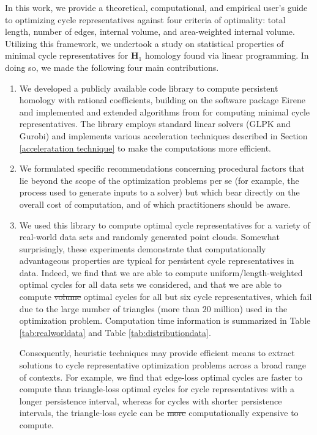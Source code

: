 \documentclass[utf8]{formatting_stuff/frontiersFPHY}
\newcommand{\Homologies}[0]{\mathbf{H}}
\newcommand{\tab}{Table }
\newcommand{\se}{Section }
\theoremstyle{plain}
\theoremstyle{definition}
\providecommand{\DIFaddtex}[1]{{\protect\color{blue}\uwave{#1}}}
\providecommand{\DIFdeltex}[1]{{\protect\color{red}\sout{#1}}}
\providecommand{\DIFaddbegin}{} %
\providecommand{\DIFaddend}{} %
\providecommand{\DIFdelbegin}{} %
\providecommand{\DIFdelend}{} %
\providecommand{\DIFadd}[1]{\texorpdfstring{\DIFaddtex{#1}}{#1}} %
\providecommand{\DIFdel}[1]{\texorpdfstring{\DIFdeltex{#1}}{}} %
\begin{document}
In this work, we provide a theoretical, computational, and empirical user's guide to optimizing cycle representatives against four criteria of optimality: total length, number of edges, internal volume, and area-weighted internal volume. Utilizing this framework, we undertook a study on statistical properties of minimal cycle representatives for $\Homologies_1$ homology found via linear programming. In doing so, we made the following four main contributions.
\begin{enumerate}
    \item We developed a publicly available code library \cite{li_thompson} to compute persistent homology with rational coefficients, building on the software package Eirene \cite{eirene} and implemented and extended algorithms from \cite{Escolar2016, Obayashi2018}  for computing minimal cycle representatives. The library employs standard linear solvers (GLPK and Gurobi) and implements various acceleration techniques described in \se \ref{acceleratation technique} to make the computations more efficient. 
    \item We formulated specific recommendations concerning procedural factors that lie beyond the scope of the optimization problems per se (for example, the process used to generate inputs to a solver) but which bear directly on the overall cost of computation, and of which practitioners should be aware. 
    \item We used this library to compute optimal cycle representatives for a variety of real-world data sets and randomly generated point clouds.  Somewhat surprisingly, these experiments demonstrate that computationally advantageous properties are typical for persistent cycle representatives in data. Indeed, we find that we are able to compute uniform/length-weighted optimal cycles for all data sets we considered, and that we are able to compute \DIFdelbegin \DIFdel{volume }\DIFdelend \DIFaddbegin \DIFadd{triangle-loss }\DIFaddend optimal cycles for all but six cycle representatives, which fail due to the large number of triangles (more than $20$ million) used in the optimization problem. Computation time information is summarized in \tab \ref{tab:realworldata} and \tab \ref{tab:distributiondata}. 

    Consequently, heuristic techniques may provide efficient means to extract solutions to cycle representative optimization problems across a broad range of contexts. For example, we find that edge-loss optimal cycles are faster to compute than triangle-loss optimal cycles for cycle representatives with a longer persistence interval, whereas for cycles with shorter persistence intervals, the triangle-loss cycle can be \DIFdelbegin \DIFdel{more }\DIFdelend \DIFaddbegin \DIFadd{less }\DIFaddend computationally expensive to compute.


\end{enumerate}
\end{document}
